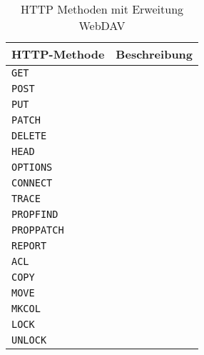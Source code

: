 \begin{table}[h]
  \centering
  \begin{tabular}{lp{7cm}}
    \toprule
    \textbf{HTTP-Methode} & \textbf{Beschreibung} \\
    \midrule
    \verb=GET= &  \\
    \verb=POST= & \\
    \verb=PUT= & \\
    \verb=PATCH= & \\
    \verb=DELETE= & \\
    \verb=HEAD= & \\
    \verb=OPTIONS= & \\
    \verb=CONNECT= & \\
    \verb=TRACE= & \\
    \verb=PROPFIND= & \\
    \verb=PROPPATCH= &  \\
    \verb=REPORT= & \\
    \verb=ACL= & \\
    \verb=COPY= & \\
    \verb=MOVE= & \\
    \verb=MKCOL= & \\
    \verb=LOCK= & \\
    \verb=UNLOCK= & \\
    \bottomrule
  \end{tabular}
  
  \caption{HTTP Methoden mit Erweitung WebDAV}
  \medskip
  \label{tab:httpmethods}
\end{table}

